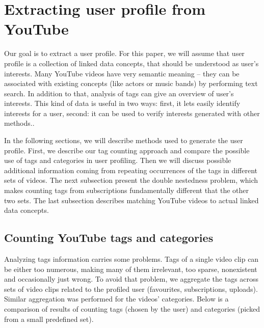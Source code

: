 \section{Extracting user profile from YouTube}

Our goal is to extract a user profile. For this paper, we will assume that user
profile is a collection of linked data concepts, that should be understood as
user's interests. Many YouTube videos have very semantic meaning -- they can
be associated with existing concepts (like actors or music bands) by performing
text search. In addition to that, analysis of tags can give an overview of user's
interests. This kind of data is useful in two
ways: first, it lets easily identify interests for a user, second: it can be
used to verify interests generated with other methods..

In the following sections, we will describe methods used to generate the user
profile. First, we describe our tag counting approach and compare the possible
use of tags and categories in user profiling. Then we will discuss possible
additional information coming from repeating occurrences of the tags in
different sets of videos. The next subsection present the double
nestedness problem, which makes counting tags from subscriptions fundamentally
different that the other two sets. The last subsection describes matching
YouTube videos to actual linked data concepts.

\subsection{Counting YouTube tags and categories}
Analyzing tags information carries some problems. Tags of a single video clip
can be either too numerous, making many
of them irrelevant, too sparse, nonexistent and occasionally just wrong. To avoid
that problem, we aggregate the tags across sets of video clips related to the
profiled user (favourites, subscriptions, uploads). Similar aggregation was
performed for the videos' categories. Below is a comparison of results of counting
tags (chosen by the user) and categories (picked from a small predefined set).


